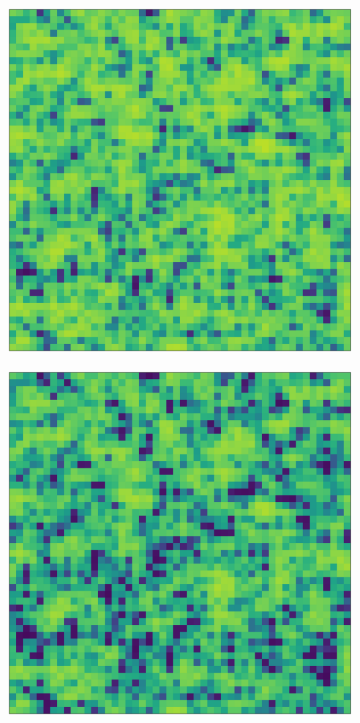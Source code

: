 \documentclass[../main.tex]{subfiles}
\begin{document}
\begin{figure}[H]
\begin{subfigure}[b]{0.11\textwidth}
    \end{subfigure}
    \hfill
    \begin{subfigure}[b]{0.11\textwidth}
        \centering 
        \includegraphics[keepaspectratio, width = \linewidth]{../figures/fig3.8.2.5.png}
    \end{subfigure}
    \hfill
    \begin{subfigure}[b]{0.11\textwidth}
        \centering 
        \includegraphics[keepaspectratio, width = \linewidth]{../figures/fig3.8.2.6.png}

\end{subfigure}
\end{figure}
\end{document}
